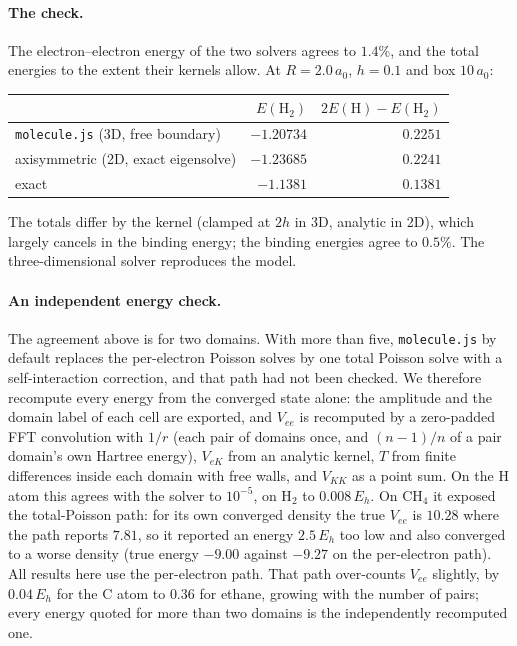 \documentclass[11pt]{article}
\begin{document}
\paragraph{The check.} The electron--electron energy of the two solvers agrees to $1.4\%$, and the
total energies to the extent their kernels allow. At $R = 2.0\,a_0$, $h = 0.1$ and box $10\,a_0$:
\begin{center}
\small
\begin{tabular}{lrr}
\toprule
& $E(\mathrm{H}_2)$ & $2E(\mathrm{H}) - E(\mathrm{H}_2)$ \\
\midrule
\texttt{molecule.js} (3D, free boundary) & $-1.20734$ & $0.2251$ \\
axisymmetric (2D, exact eigensolve)      & $-1.23685$ & $0.2241$ \\
exact                                    & $-1.1381$  & $0.1381$ \\
\bottomrule
\end{tabular}
\end{center}
The totals differ by the kernel (clamped at $2h$ in 3D, analytic in 2D), which largely cancels in
the binding energy; the binding energies agree to $0.5\%$. The three-dimensional solver reproduces
the model.

\paragraph{An independent energy check.} The agreement above is for two domains. With more than five,
\texttt{molecule.js} by default replaces the per-electron Poisson solves by one total Poisson solve with
a self-interaction correction, and that path had not been checked. We therefore recompute every
energy from the converged state alone: the amplitude and the domain label of each cell are exported,
and $V_{ee}$ is recomputed by a zero-padded FFT convolution with $1/r$ (each pair of domains once, and
$(n-1)/n$ of a pair domain's own Hartree energy), $V_{eK}$ from an analytic kernel, $T$ from finite
differences inside each domain with free walls, and $V_{KK}$ as a point sum. On the H atom this agrees
with the solver to $10^{-5}$, on H$_2$ to $0.008\,E_h$. On CH$_4$ it exposed the total-Poisson path:
for its own converged density the true $V_{ee}$ is $10.28$ where the path reports $7.81$, so it
reported an energy $2.5\,E_h$ too low and also converged to a worse density (true energy $-9.00$
against $-9.27$ on the per-electron path). All results here use the per-electron path. That path
over-counts $V_{ee}$ slightly, by $0.04\,E_h$ for the C atom to $0.36$ for ethane, growing with the
number of pairs; every energy quoted for more than two domains is the independently recomputed one.
\end{document}
